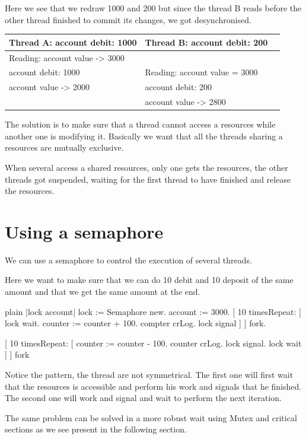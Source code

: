 \documentclass[10pt,twoside,english]{_support/latex/sbabook/sbabook}
\begin{document}
Here we see that we redraw 1000 and 200 but since the thread B reads before 
the other thread finished to commit its changes, we got desynchronised.

\begin{tabular}{lll}
\toprule
\textbf{Thread A: account debit: 1000} & \textbf{Thread B: account debit: 200} &  \\
\midrule
Reading: account value -\textgreater{} 3000 &  &  \\
account debit: 1000 & Reading: account value = 3000 &  \\
account value -\textgreater{} 2000 & account debit: 200 &  \\
 & account value -\textgreater{} 2800 \\
\bottomrule
\end{tabular}

The solution is to make sure that a thread cannot access a resources while another one is modifying it. Basically we want that all the threads sharing a resources are mutually exclusive. 

When several access a shared resources, only one gets the resources, the other threads got suspended, waiting for the first thread to have finished and release the resources.
\section{Using a semaphore}
We can use a semaphore to control the execution of several threads. 

Here we want to make sure that we can do 10 debit and 10 deposit of the same amount and that we get the same amount at the end. 

\begin{displaycode}{plain}
|lock account|
lock := Semaphore new.
account := 3000.
[ 10 timesRepeat: [
	lock wait.
	counter := counter + 100.
	compter crLog.
	lock signal ]
	] fork.
	
[ 10 timesRepeat: [
	counter := counter - 100.
	counter crLog. 
	lock signal. 
	lock wait ]
	] fork
\end{displaycode}

Notice the pattern, the thread are not symmetrical. 
The first one will first wait that the resources is accessible and perform his work 
and signals that he finished. 
The second one will work and signal and wait to perform the next iteration.

The same problem can be solved in a more robust wait using Mutex and critical sections
as we see present in the following section.
\end{document}
